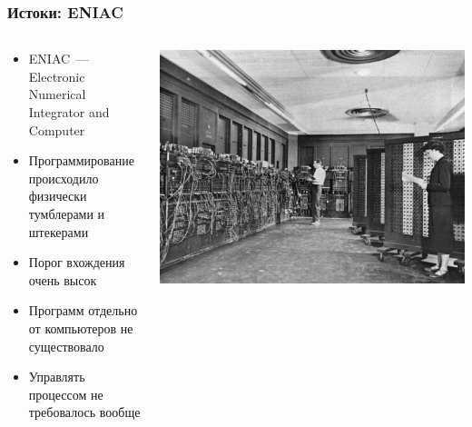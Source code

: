 \documentclass{../../slides-style}
\begin{document}
    \begin{frame}
        \frametitle{Истоки: ENIAC}
        \begin{columns}
            \begin{column}{0.5\textwidth}
                \begin{itemize}
                    \item ENIAC~--- Electronic Numerical Integrator and Computer 
                    \item Программирование происходило физически тумблерами и штекерами
                    \item Порог вхождения очень высок
                    \item Программ отдельно от компьютеров не существовало
                    \item Управлять процессом не требовалось вообще
                \end{itemize}
            \end{column}
            \begin{column}{0.5\textwidth}
                \begin{center}
                    \includegraphics[width=\textwidth]{eniac.png}
                \end{center}
            \end{column}
        \end{columns}
    \end{frame}
\end{document}
